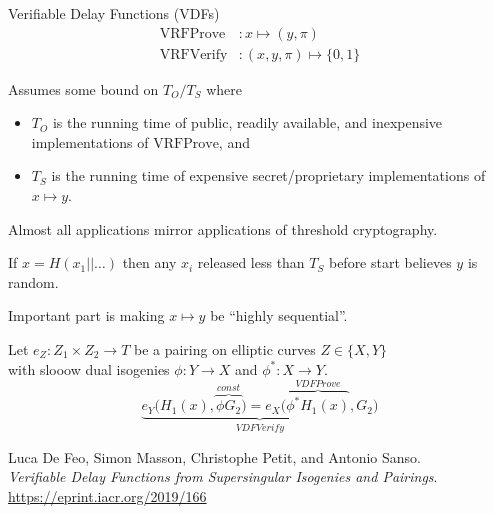 \documentclass[fleqn,xcolor={usenames,dvipsnames},notes,aspectratio=169]{beamer} %
\begin{document}
\def\seed{x} %

\begin{frame}[t]{Verifiable Delay Functions (VDFs)}
\vspace{-20pt}
\begin{align*}
\mathrm{VRFProve} &: \seed \mapsto (y,\pi) \\
\mathrm{VRFVerify} &: (\seed,y,\pi) \mapsto \{0,1\} 
\end{align*}

\medskip

Assumes some bound on $T_O/T_S$ where
\begin{itemize}
\item $T_O$ is the running time of public, readily available, and inexpensive implementations of $\mathrm{VRFProve}$, and \\
\item $T_S$ is the running time of expensive secret/proprietary implementations of $x \mapsto y$.
\end{itemize}

\bigskip

Almost all applications mirror applications of threshold cryptography. \\ \medskip

If $\seed = H(\seed_1 || \ldots)$ then any $\seed_i$ released less than $T_S$ before start believes $y$ is random. 

\bigskip\bigskip

Important part is making $\seed \mapsto y$ be ``highly sequential''.

\end{frame}


\begin{frame}[t]
 
Let $e_Z : Z_1 \times Z_2 \to T$ be a pairing on elliptic curves $Z \in \{ X, Y \}$ \\ \smallskip
with slooow dual isogenies $\phi : Y \to X$ and $\phi^* : X \to Y$. \\

\bigskip
$$ 
\underbrace{
 e_Y \bigl( H_1(\seed), \overbrace{\phi G_2}^{const} \bigr)
=
 e_X \bigl( \overbrace{\phi^* H_1(\seed)}^{VDFProve}, G_2 \bigr)
}_{VDFVerify}
$$

\bigskip
\bigskip

Luca De Feo, Simon Masson, Christophe Petit, and Antonio Sanso. \\
{\it Verifiable Delay Functions from Supersingular Isogenies and Pairings}.
\url{https://eprint.iacr.org/2019/166}

\end{frame}
\end{document}
